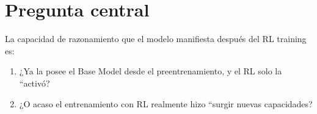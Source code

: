 \section{Pregunta central}
La capacidad de razonamiento que el modelo manifiesta después del RL training es:
\begin{enumerate}
  \item ¿Ya la posee el Base Model desde el preentrenamiento, y el RL solo la ``activó?
  \item ¿O acaso el entrenamiento con RL realmente hizo ``surgir nuevas capacidades?
\end{enumerate}

